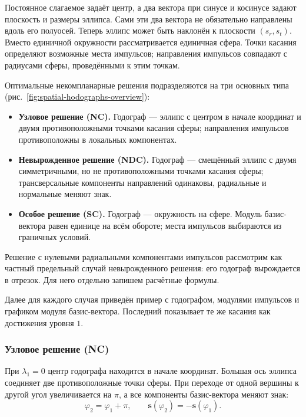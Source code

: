 Постоянное слагаемое задаёт центр, а два вектора при синусе и косинусе
задают плоскость и размеры эллипса. Сами эти два вектора
не обязательно направлены вдоль его полуосей. Теперь эллипс может быть
наклонён к плоскости $(s_r,s_t)$.
Вместо единичной окружности рассматривается единичная сфера.
Точки касания определяют возможные места импульсов; направления
импульсов совпадают с радиусами сферы, проведёнными к этим точкам.

Оптимальные некомпланарные решения подразделяются на три основных типа
\cite[гл.~2]{baranov-ru} (рис.~\ref{fig:spatial-hodographs-overview}):
\begin{itemize}[leftmargin=*]
 \item \textbf{Узловое решение (NC).} Годограф --- эллипс с центром
 в начале координат и двумя противоположными точками касания сферы;
 направления импульсов противоположны в локальных компонентах.
 \item \textbf{Невырожденное решение (NDC).} Годограф --- смещённый
 эллипс с двумя симметричными, но не противоположными точками касания
 сферы; трансверсальные компоненты направлений одинаковы,
 радиальные и нормальные меняют знак.
 \item \textbf{Особое решение (SC).} Годограф --- окружность на сфере.
 Модуль базис-вектора равен единице на всём обороте;
 места импульсов выбираются из граничных условий.
\end{itemize}
Решение с нулевыми радиальными компонентами импульсов рассмотрим
как частный предельный случай невырожденного решения:
его годограф вырождается в отрезок. Для него отдельно запишем расчётные формулы.



Далее для каждого случая приведён пример с годографом, модулями импульсов
и графиком модуля базис-вектора. Последний показывает те же касания
как достижения уровня $1$.

\subsubsection{Узловое решение (NC)}
\label{sec:NC}

При $\lambda_1=0$ центр годографа находится в начале координат.
Большая ось эллипса соединяет две противоположные точки сферы.
При переходе от одной вершины к другой угол увеличивается на $\pi$,
а все компоненты базис-вектора меняют знак:
\[
 \varphi_2=\varphi_1+\pi,\qquad
 \boldsymbol s(\varphi_2)=-\boldsymbol s(\varphi_1).
\]

